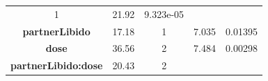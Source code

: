 \documentclass[]{article}
\begin{document}
\begin{longtable}[]{@{}ccccc@{}}
\begin{minipage}[t]{0.06\columnwidth}
1\strut
\end{minipage} & \begin{minipage}[t]{0.12\columnwidth}\centering\strut
21.92\strut
\end{minipage} & \begin{minipage}[t]{0.13\columnwidth}\centering\strut
9.323e-05\strut
\end{minipage}\tabularnewline
\begin{minipage}[t]{0.30\columnwidth}\centering\strut
\textbf{partnerLibido}\strut
\end{minipage} & \begin{minipage}[t]{0.11\columnwidth}\centering\strut
17.18\strut
\end{minipage} & \begin{minipage}[t]{0.06\columnwidth}\centering\strut
1\strut
\end{minipage} & \begin{minipage}[t]{0.12\columnwidth}\centering\strut
7.035\strut
\end{minipage} & \begin{minipage}[t]{0.13\columnwidth}\centering\strut
0.01395\strut
\end{minipage}\tabularnewline
\begin{minipage}[t]{0.30\columnwidth}\centering\strut
\textbf{dose}\strut
\end{minipage} & \begin{minipage}[t]{0.11\columnwidth}\centering\strut
36.56\strut
\end{minipage} & \begin{minipage}[t]{0.06\columnwidth}\centering\strut
2\strut
\end{minipage} & \begin{minipage}[t]{0.12\columnwidth}\centering\strut
7.484\strut
\end{minipage} & \begin{minipage}[t]{0.13\columnwidth}\centering\strut
0.00298\strut
\end{minipage}\tabularnewline
\begin{minipage}[t]{0.30\columnwidth}\centering\strut
\textbf{partnerLibido:dose}\strut
\end{minipage} & \begin{minipage}[t]{0.11\columnwidth}\centering\strut
20.43\strut
\end{minipage} & \begin{minipage}[t]{0.06\columnwidth}\centering\strut
2\strut
\end{minipage} & \begin{minipage}[t]{0.12\columnwidth}\centering\strut

\end{minipage}
\end{longtable}
\end{document}
